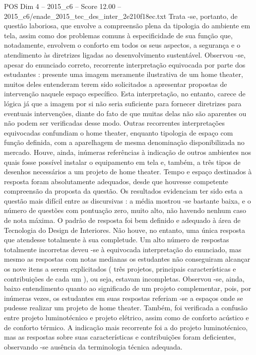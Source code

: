 \begin{textsample}{POS Dim 4 – 2015\_c6 – Score 12.00 – 2015\_c6/enade\_2015\_tec\_des\_inter\_2e210f18ec.txt}
Trata -se, portanto, de questão laboriosa, que envolve a compreensão plena da tipologia do ambiente em tela, assim como dos problemas comuns à especificidade de sua função que, notadamente, envolvem o conforto em todos os seus aspectos, a segurança e o atendimento às diretrizes ligadas ao desenvolvimento sustentável.
Observou -se, apesar do enunciado correto, recorrente interpretação equivocada por parte dos estudantes : presente uma imagem meramente ilustrativa de um home theater, muitos deles entenderam terem sido solicitados a apresentar propostas de intervenção naquele espaço específico.
Esta interpretação, no entanto, carece de lógica já que a imagem por si não seria suficiente para fornecer diretrizes para eventuais intervenções, diante do fato de que muitas delas não são aparentes ou não podem ser verificadas desse modo.
Outras recorrentes interpretações equivocadas confundiam o home theater, enquanto tipologia de espaço com função definida, com a aparelhagem de mesma denominação disponibilizada no mercado.
Houve, ainda, inúmeras referências à indicação de outros ambientes nos quais fosse possível instalar o equipamento em tela e, também, a três tipos de desenhos necessários a um projeto de home theater.
Tempo e espaço destinados à resposta foram absolutamente adequados, desde que houvesse competente compreensão da proposta da questão.
Os resultados evidenciam ter sido esta a questão mais difícil entre as discursivas : a média mostrou -se bastante baixa, e o número de questões com pontuação zero, muito alto, não havendo nenhum caso de nota máxima.
O padrão de resposta foi bem definido e adequado à área de Tecnologia do Design de Interiores.
Não houve, no entanto, uma única resposta que atendesse totalmente à sua completude.
Um alto número de respostas totalmente incorretas deveu -se à equivocada interpretação do enunciado, mas mesmo as respostas com notas medianas os estudantes não conseguiram alcançar os nove itens a serem explicitados ( três projetos, principais características e contribuições de cada um ), ou seja, estavam incompletas.
Observou -se, ainda, baixo entendimento quanto ao significado de um projeto complementar, pois, por inúmeras vezes, os estudantes em suas respostas referiam -se a espaços onde se pudesse realizar um projeto de home theater.
Também, foi verificada a confusão entre projeto luminotécnico e projeto elétrico, assim como de conforto acústico e de conforto térmico.
A indicação mais recorrente foi a do projeto luminotécnico, mas as respostas sobre suas características e contribuições foram deficientes, observando -se ausência da terminologia técnica adequada.

\end{textsample}
